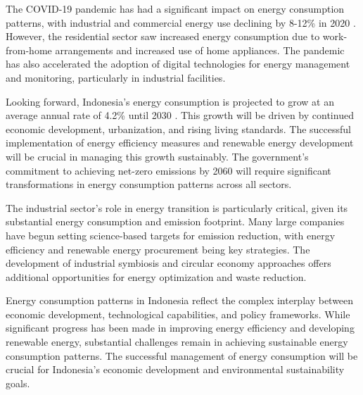 The COVID-19 pandemic has had a significant impact on energy consumption patterns, with industrial and commercial energy use declining by 8-12\% in 2020 \cite{IEA2021}. However, the residential sector saw increased energy consumption due to work-from-home arrangements and increased use of home appliances. The pandemic has also accelerated the adoption of digital technologies for energy management and monitoring, particularly in industrial facilities.

Looking forward, Indonesia's energy consumption is projected to grow at an average annual rate of 4.2\% until 2030 \cite{MEMR2021}. This growth will be driven by continued economic development, urbanization, and rising living standards. The successful implementation of energy efficiency measures and renewable energy development will be crucial in managing this growth sustainably. The government's commitment to achieving net-zero emissions by 2060 will require significant transformations in energy consumption patterns across all sectors.

The industrial sector's role in energy transition is particularly critical, given its substantial energy consumption and emission footprint. Many large companies have begun setting science-based targets for emission reduction, with energy efficiency and renewable energy procurement being key strategies. The development of industrial symbiosis and circular economy approaches offers additional opportunities for energy optimization and waste reduction.

Energy consumption patterns in Indonesia reflect the complex interplay between economic development, technological capabilities, and policy frameworks. While significant progress has been made in improving energy efficiency and developing renewable energy, substantial challenges remain in achieving sustainable energy consumption patterns. The successful management of energy consumption will be crucial for Indonesia's economic development and environmental sustainability goals.